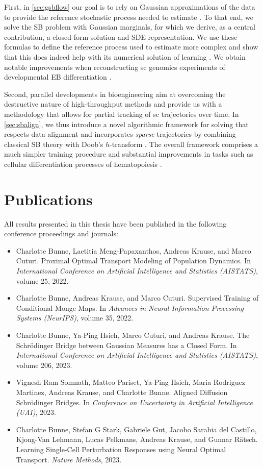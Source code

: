 First, in \cref{sec:gsbflow} our goal is to rely on Gaussian approximations of the data to provide the reference stochastic process needed to estimate . To that end, we solve the \acrlong{SB} problem with Gaussian marginals, for which we derive, as a central contribution, a closed-form solution and \acrshort{SDE} representation. We use these formulas to define the reference process used to estimate more complex  and show that this does indeed help with its numerical solution of learning . We obtain notable improvements when reconstructing \acrlong{sc} genomics experiments of developmental \acrfull{EB} differentiation \citep{bunne2022recovering}.

Second, parallel developments in bioengineering aim at overcoming the destructive nature of high-throughput methods and provide us with a methodology that allows for partial tracking of \acrlong{sc} trajectories over time.
In \cref{sec:sbalign}, we thus introduce a novel algorithmic framework for solving  that respects data alignment and incorporates \emph{sparse} trajectories by combining classical \acrlong{SB} theory with Doob's 
$h$-transform \citep{somnath2023aligned}. The overall framework comprises a much simpler training procedure and substantial improvements in tasks such as cellular differentiation processes of hematopoiesis \citep{weinreb2020lineage}.


\section{Publications}
All results presented in this thesis have been published in the following conference proceedings and journals:

\begin{itemize}
	\item[] Charlotte Bunne, Laetitia Meng-Papaxanthos, Andreas Krause, and Marco Cuturi. Proximal Optimal Transport Modeling of Population Dynamics. In \textit{International Conference on Artificial Intelligence and Statistics (AISTATS)}, volume 25, 2022.
	\item[] Charlotte Bunne, Andreas Krause, and Marco Cuturi. Supervised Training of Conditional Monge Maps. In \textit{Advances in Neural Information Processing Systems (NeurIPS)}, volume 35, 2022.
	\item[] Charlotte Bunne, Ya-Ping Hsieh, Marco Cuturi, and Andreas Krause. The Schr{\"o}dinger Bridge between Gaussian Measures has a Closed Form. In \textit{International Conference on Artificial Intelligence and Statistics (AISTATS)}, volume 206, 2023.
	\item[] Vignesh Ram Somnath, Matteo Pariset, Ya-Ping Hsieh, Maria Rodriguez Martinez, Andreas Krause, and Charlotte Bunne. Aligned Diffusion Schr{\"o}dinger Bridges. In \textit{Conference on Uncertainty in Artificial Intelligence (UAI)}, 2023.
	\item[] Charlotte Bunne, Stefan G Stark, Gabriele Gut, Jacobo Sarabia del Castillo, Kjong-Van Lehmann, Lucas Pelkmans, Andreas Krause, and Gunnar R{\"a}tsch. Learning Single-Cell Perturbation Responses using Neural Optimal Transport. \textit{Nature Methods}, 2023.
\end{itemize}


